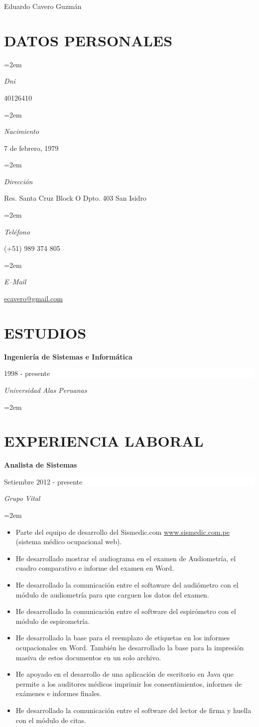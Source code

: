 \documentclass[paper=a4,fontsize=11pt]{scrartcl} %
\newlength{\spacebox}
\newcommand{\sepspace}{\vspace*{1em}}		%
\newcommand{\MyName}[1]{ %
		\Huge \usefont{OT1}{phv}{b}{n} \hfill #1
		\par \normalsize \normalfont}
\newcommand{\NewPart}[1]{\section*{\uppercase{#1}}}
\newcommand{\PersonalEntry}[2]{
		\noindent\hangindent=2em\hangafter=0 %
		\parbox{\spacebox}{        %
		\textit{#1}}		       %
		\hspace{8em} #2 \par}    %
\newcommand{\EducationEntry}[4]{
		\noindent \textbf{#1} \hfill      %
		\colorbox{White}{%
			\parbox{5cm}{%
			\hfill\color{Black}#2}} \par  %
		\noindent \textit{#3} \par        %
		\noindent\hangindent=2em\hangafter=0 \small #4 %
		\normalsize \par}
\begin{document}
\begin{center}
\end{center}


\MyName{Eduardo Cavero Guzmán}
\sepspace

\NewPart{Datos personales}{}

\PersonalEntry{Dni}{40126410}
\PersonalEntry{Nacimiento}{7 de febrero, 1979}
\PersonalEntry{Dirección}{Res. Santa Cruz Block O Dpto. 403 San Isidro}
\PersonalEntry{Teléfono}{(+51) 989 374 805}
\PersonalEntry{E--Mail}{\url{ecavero@gmail.com}}


\NewPart{Estudios}{}

\EducationEntry{Ingeniería de Sistemas e Informática}{1998 - presente}{Universidad Alas Peruanas}{}
\sepspace


\NewPart{Experiencia laboral}{}

\EducationEntry{Analista de Sistemas}{Setiembre 2012 - presente}{Grupo Vital}{
\begin{itemize}
\item{Parte del equipo de desarrollo del Sismedic.com \url{www.sismedic.com.pe} (sistema médico ocupacional web).}
\item{He desarrollado mostrar el audiograma en el examen de Audiometría, el cuadro comparativo e informe del examen en Word.}
\item{He desarrollado la comunicación entre el softaware del audiómetro con el módulo de audiometría para que carguen los datos del examen.}
\item{He desarrollado la comunicación entre el software del espirómetro con el módulo de espirometría.}
\item{He desarrollado la base para el reemplazo de etiquetas en los informes ocupacionales en Word. También he desarrollado la base para la impresión masiva de estos documentos en un solo archivo.}
\item{He apoyado en el desarrollo de una aplicación de escritorio en Java que permite a los auditores médicos imprimir los consentimientos, informes de exámenes e informes finales.}
\item{He desarrollado la comunicación entre el software del lector de firma y huella con el módulo de citas.}
\end{itemize}
}
\sepspace
\end{document}
